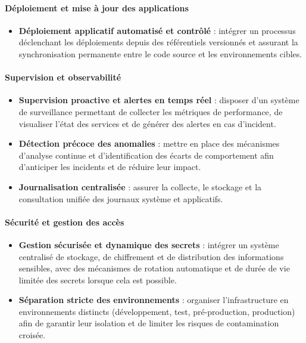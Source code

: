 \paragraph{\textbf{Déploiement et mise à jour des applications}}

\begin{itemize}
	\item \textbf{Déploiement applicatif automatisé et contrôlé} : intégrer un processus déclenchant les déploiements depuis des référentiels versionnés et assurant la synchronisation permanente entre le code source et les environnements cibles.
\end{itemize}

\paragraph{\textbf{Supervision et observabilité}}

\begin{itemize}
	\item \textbf{Supervision proactive et alertes en temps réel} : disposer d'un système de surveillance permettant de collecter les métriques de performance, de visualiser l'état des services et de générer des alertes en cas d'incident.
	\item \textbf{Détection précoce des anomalies} : mettre en place des mécanismes d'analyse continue et d'identification des écarts de comportement afin d'anticiper les incidents et de réduire leur impact.
	\item \textbf{Journalisation centralisée} : assurer la collecte, le stockage et la consultation unifiée des journaux système et applicatifs.
\end{itemize}

\paragraph{\textbf{Sécurité et gestion des accès}}

\begin{itemize}
	\item \textbf{Gestion sécurisée et dynamique des secrets} : intégrer un système centralisé de stockage, de chiffrement et de distribution des informations sensibles, avec des mécanismes de rotation automatique et de durée de vie limitée des secrets lorsque cela est possible.
	\item \textbf{Séparation stricte des environnements} : organiser l'infrastructure en environnements distincts (développement, test, pré-production, production) afin de garantir leur isolation et de limiter les risques de contamination croisée.
\end{itemize}

